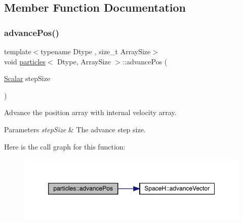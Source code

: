 \subsection{Member Function Documentation}
\mbox{\label{classparticles_aba80bb0aa2f0c0aa9c6f14e12527b555}} 
\subsubsection{\texorpdfstring{advance\+Pos()}{advancePos()}}
{\footnotesize\ttfamily template$<$typename Dtype , size\+\_\+t Array\+Size$>$ \\
void \mbox{\hyperlink{classparticles}{particles}}$<$ Dtype, Array\+Size $>$\+::advance\+Pos (\begin{DoxyParamCaption}\item[{\mbox{\hyperlink{classparticles_a57a6b6582045a4b20742b99c513e9f63}{Scalar}}}]{step\+Size }\end{DoxyParamCaption})\hspace{0.3cm}{\ttfamily [inline]}}



Advance the position array with internal velocity array. 


\begin{DoxyParams}{Parameters}
{\em step\+Size} & The advance step size. \\
\hline
\end{DoxyParams}
Here is the call graph for this function\+:\nopagebreak
\begin{figure}[H]
\begin{center}
\leavevmode
\includegraphics[width=350pt]{classparticles_aba80bb0aa2f0c0aa9c6f14e12527b555_cgraph}
\end{center}
\end{figure}
\mbox{\label{classparticles_a1d8e3660ebc35d0e422942aa05621cb9}} 
